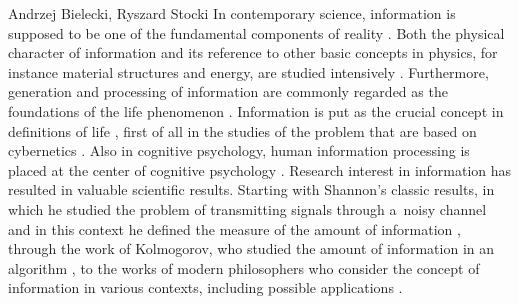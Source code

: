 \begin{artengenv2auth}{Andrzej Bielecki, Ryszard Stocki}
\lettrine[loversize=0.13,lines=2,lraise=-0.03,nindent=0em,findent=0.2pt]%
{I}{}n contemporary science, information is supposed to be one of the fundamental components of reality 
\parencites[][]{barreiro_third_2020}[][]{Krzanowski_Roman_Ontological}[][]{krzanowski_what_2020}. %
 Both the physical character of information and its reference to other basic concepts in physics, for instance material structures and energy, are studied intensively 
\parencites[][]{krzanowski_ontological_2022-1}[][]{krzanowski_ontological_2022}[][]{mscislawski_is_2022}[][]{polak_beyond_2022}. %
 Furthermore, generation and processing of information are commonly regarded as the foundations of the life phenomenon 
\parencites[][]{smith_concept_2000}[][]{nurse_life_2008}[][]{nurse_what_2020}[][]{davies_demon_2019}. %
 Information is put as the crucial concept in definitions of life 
\parencites[][]{bielecki_general_2015}[][]{Bielecki_2016}[][]{davies_demon_2019}, %
 first of all in the studies of the problem that are based on cybernetics 
\parencite[][]{korzeniewski_cybernetic_2001}. %
 Also in cognitive psychology, human information processing is placed at the center of cognitive psychology 
\parencite[][]{lindsay_human_1972}. %
 Research interest in information has resulted in valuable scientific results. Starting with Shannon's classic results, in which he studied the problem of transmitting signals through a~noisy channel and in this context he defined the measure of the amount of information 
\parencite[][]{shannon_mathematical_1948}, %
 through the work of Kolmogorov, who studied the amount of information in an algorithm 
\parencite[][]{kolmogorov_three_1965}, %
 to the works of modern philosophers who consider the concept of information in various contexts, including possible applications 
\parencites[][]{bateson_information_1951}[][]{smith_concept_2000}[][]{burgin_information_2011}[][]{ebeling_selforganization_2015}[][]{davies_demon_2019}[][]{dodig-crnkovic_theoretical_2019}.%





\end{artengenv2auth}
